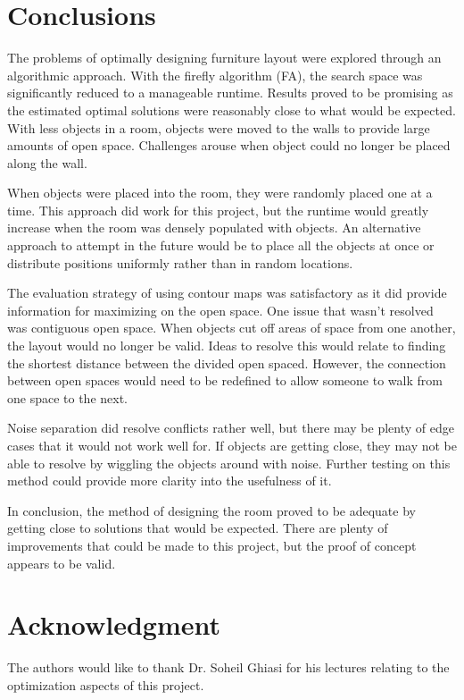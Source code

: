 \documentclass[sigconf,authordraft]{acmart}
\begin{document}
\section{Conclusions}
The problems of optimally designing furniture layout were explored through an algorithmic approach. With the firefly algorithm (FA), the search space was significantly reduced to a manageable runtime. Results proved to be promising as the estimated optimal solutions were reasonably close to what would be expected. With less objects in a room, objects were moved to the walls to provide large amounts of open space. Challenges arouse when object could no longer be placed along the wall.

When objects were placed into the room, they were randomly placed one at a time. This approach did work for this project, but the runtime would greatly increase when the room was densely populated with objects. An alternative approach to attempt in the future would be to place all the objects at once or distribute positions uniformly rather than in random locations.

The evaluation strategy of using contour maps was satisfactory as it did provide information for maximizing on the open space. One issue that wasn’t resolved was contiguous open space. When objects cut off areas of space from one another, the layout would no longer be valid. Ideas to resolve this would relate to finding the shortest distance between the divided open spaced. However, the connection between open spaces would need to be redefined to allow someone to walk from one space to the next.

Noise separation did resolve conflicts rather well, but there may be plenty of edge cases that it would not work well for. If objects are getting close, they may not be able to resolve by wiggling the objects around with noise. Further testing on this method could provide more clarity into the usefulness of it.

In conclusion, the method of designing the room proved to be adequate by getting close to solutions that would be expected. There are plenty of improvements that could be made to this project, but the proof of concept appears to be valid.


\section*{Acknowledgment}
The authors would like to thank Dr. Soheil Ghiasi for his lectures relating to the optimization aspects of this project.
\end{document}
